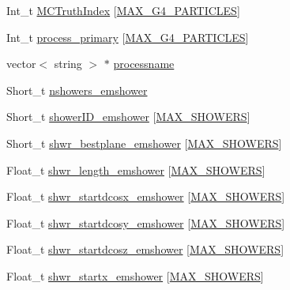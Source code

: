 \begin{DoxyCompactItemize}
\item 
Int\-\_\-t \hyperlink{classanatree_a894f10e8e21f088ef42d5f2688eb2430}{M\-C\-Truth\-Index} \mbox{[}\hyperlink{anatree__core__v09410002_8h_aa5cbba5cc53c011e88805f38503de894}{M\-A\-X\-\_\-\-G4\-\_\-\-P\-A\-R\-T\-I\-C\-L\-E\-S}\mbox{]}
\item 
Int\-\_\-t \hyperlink{classanatree_a104d39060f7947f9e5c2ee46e33ef686}{process\-\_\-primary} \mbox{[}\hyperlink{anatree__core__v09410002_8h_aa5cbba5cc53c011e88805f38503de894}{M\-A\-X\-\_\-\-G4\-\_\-\-P\-A\-R\-T\-I\-C\-L\-E\-S}\mbox{]}
\item 
vector$<$ string $>$ $\ast$ \hyperlink{classanatree_a5f73011fc98884bb1cfe96f9dcc863e7}{processname}
\item 
Short\-\_\-t \hyperlink{classanatree_a80eafdfb7712108c482a65427d4dab62}{nshowers\-\_\-emshower}
\item 
Short\-\_\-t \hyperlink{classanatree_a35b20eca4b3c6b9309254a99199aa916}{shower\-I\-D\-\_\-emshower} \mbox{[}\hyperlink{anatree__core__v09410002_8h_aa8deaf72f1f7bd4b88c7d1ea07590801}{M\-A\-X\-\_\-\-S\-H\-O\-W\-E\-R\-S}\mbox{]}
\item 
Short\-\_\-t \hyperlink{classanatree_a3ba83de19a2215bceb3527513df9e878}{shwr\-\_\-bestplane\-\_\-emshower} \mbox{[}\hyperlink{anatree__core__v09410002_8h_aa8deaf72f1f7bd4b88c7d1ea07590801}{M\-A\-X\-\_\-\-S\-H\-O\-W\-E\-R\-S}\mbox{]}
\item 
Float\-\_\-t \hyperlink{classanatree_a6cb463353d2afb0949886483b33f8549}{shwr\-\_\-length\-\_\-emshower} \mbox{[}\hyperlink{anatree__core__v09410002_8h_aa8deaf72f1f7bd4b88c7d1ea07590801}{M\-A\-X\-\_\-\-S\-H\-O\-W\-E\-R\-S}\mbox{]}
\item 
Float\-\_\-t \hyperlink{classanatree_a5df50459b3dc4260963b5231427968c4}{shwr\-\_\-startdcosx\-\_\-emshower} \mbox{[}\hyperlink{anatree__core__v09410002_8h_aa8deaf72f1f7bd4b88c7d1ea07590801}{M\-A\-X\-\_\-\-S\-H\-O\-W\-E\-R\-S}\mbox{]}
\item 
Float\-\_\-t \hyperlink{classanatree_a5ecdd272fc336ed529dcc53acc471f49}{shwr\-\_\-startdcosy\-\_\-emshower} \mbox{[}\hyperlink{anatree__core__v09410002_8h_aa8deaf72f1f7bd4b88c7d1ea07590801}{M\-A\-X\-\_\-\-S\-H\-O\-W\-E\-R\-S}\mbox{]}
\item 
Float\-\_\-t \hyperlink{classanatree_a700d6e7e8277518dcb7d497574c308ab}{shwr\-\_\-startdcosz\-\_\-emshower} \mbox{[}\hyperlink{anatree__core__v09410002_8h_aa8deaf72f1f7bd4b88c7d1ea07590801}{M\-A\-X\-\_\-\-S\-H\-O\-W\-E\-R\-S}\mbox{]}
\item 
Float\-\_\-t \hyperlink{classanatree_a4cc58d005e47a1ca0abd2ef9fd226462}{shwr\-\_\-startx\-\_\-emshower} \mbox{[}\hyperlink{anatree__core__v09410002_8h_aa8deaf72f1f7bd4b88c7d1ea07590801}{M\-A\-X\-\_\-\-S\-H\-O\-W\-E\-R\-S}\mbox{]}

\end{DoxyCompactItemize}
